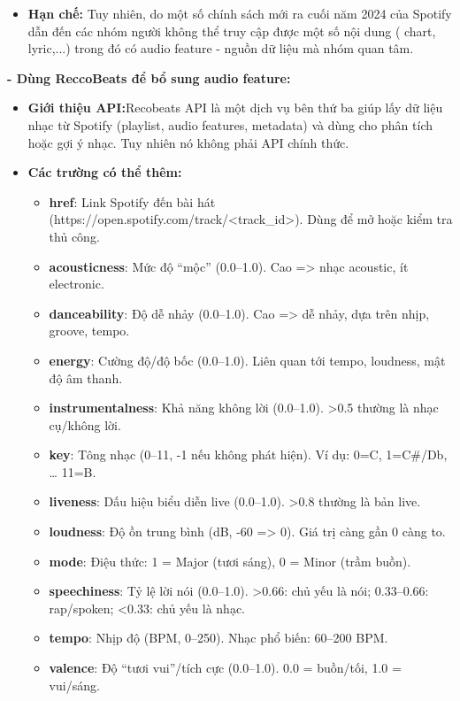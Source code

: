 \begin{itemize}
    \item \textbf{Hạn chế:} Tuy nhiên, do một số chính sách mới ra cuối năm 2024 của Spotify dẫn đến các nhóm người không thể truy cập được một số nội dung ( chart, lyric,...) trong đó có audio feature - nguồn dữ liệu mà nhóm quan tâm.
\end{itemize}
\textbf{- Dùng ReccoBeats để bổ sung audio feature: }
\begin{itemize}
    \item \textbf{Giới thiệu API:}Recobeats API là một dịch vụ bên thứ ba giúp lấy dữ liệu nhạc từ Spotify (playlist, audio features, metadata) và dùng cho phân tích hoặc gợi ý nhạc. Tuy nhiên nó không phải API chính thức.
    
    \item \textbf{Các trường có thể thêm: }
    \begin{itemize}
    \item \textbf{href}: Link Spotify đến bài hát (https://open.spotify.com/track/<track\_id>). Dùng để mở hoặc kiểm tra thủ công.
    \item \textbf{acousticness}: Mức độ “mộc” (0.0–1.0). Cao => nhạc acoustic, ít electronic.
    \item \textbf{danceability}: Độ dễ nhảy (0.0–1.0). Cao => dễ nhảy, dựa trên nhịp, groove, tempo.
    \item \textbf{energy}: Cường độ/độ bốc (0.0–1.0). Liên quan tới tempo, loudness, mật độ âm thanh.
    \item \textbf{instrumentalness}: Khả năng không lời (0.0–1.0). >0.5 thường là nhạc cụ/không lời.
    \item \textbf{key}: Tông nhạc (0–11, -1 nếu không phát hiện). Ví dụ: 0=C, 1=C\#/Db, … 11=B. 
    \item \textbf{liveness}: Dấu hiệu biểu diễn live (0.0–1.0). >0.8 thường là bản live.
    \item \textbf{loudness}: Độ ồn trung bình (dB, -60 => 0). Giá trị càng gần 0 càng to. 
    \item \textbf{mode}: Điệu thức: 1 = Major (tươi sáng), 0 = Minor (trầm buồn). 
    \item \textbf{speechiness}: Tỷ lệ lời nói (0.0–1.0). >0.66: chủ yếu là nói; 0.33–0.66: rap/spoken; <0.33: chủ yếu là nhạc.
    \item \textbf{tempo}: Nhịp độ (BPM, 0–250). Nhạc phổ biến: 60–200 BPM.
    \item \textbf{valence}: Độ “tươi vui”/tích cực (0.0–1.0). 0.0 = buồn/tối, 1.0 = vui/sáng.
    \end{itemize}

\end{itemize}

